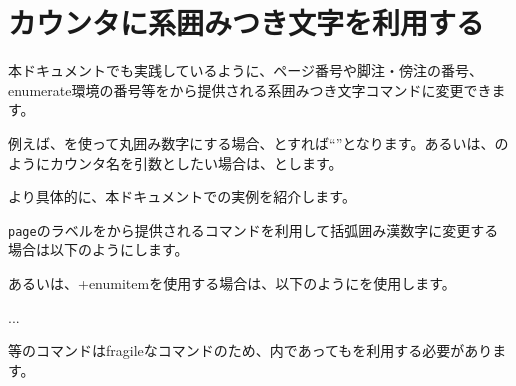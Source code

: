 \documentclass[../otf-unofficial-guide]{subfiles}
\begin{document}
\section{カウンタに\texorpdfstring{}{aj}系囲みつき文字を利用する}

本ドキュメントでも実践しているように、ページ番号や脚注・傍注の番号、enumerate環境の番号等をから提供される系囲みつき文字コマンドに変更できます。

例えば、を使って丸囲み数字にする場合、とすれば``\nobreak{}\nobreak''となります。あるいは、のようにカウンタ名を引数としたい場合は、とします。

\bigskip

より具体的に、本ドキュメントでの実例を紹介します。

\texttt{page}のラベルをから提供されるコマンドを利用して括弧囲み漢数字に変更する場合は以下のようにします。

\begin{texsource}
\renewcommand{\thepage}{\ajLabel\ajKakkoKansuji{page}}
\end{texsource}

あるいは、\pkg+{enumitem}を使用する場合は、以下のようにを使用します。

\begin{texsource}
\begin{enumerate}[label=\protect\ajMaru{\arabic{*}}]
  ...
\end{enumerate}
\end{texsource}

等のコマンドはfragileなコマンドのため、内であってもを利用する必要があります。

\begin{texsource}
\section{\protect{}}
\end{texsource}
\end{document}
